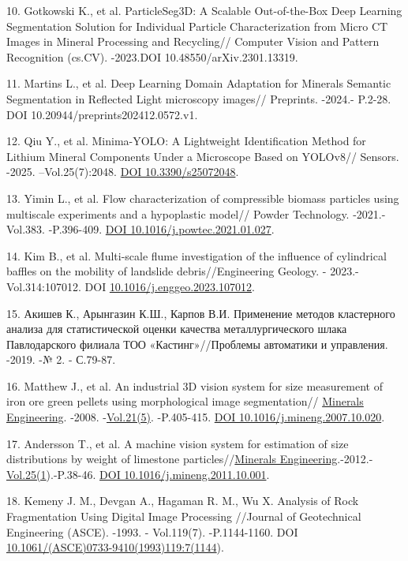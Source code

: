 \begin{refs}
10. Gotkowski K., et al. ParticleSeg3D: A Scalable Out-of-the-Box Deep
Learning Segmentation Solution for Individual Particle Characterization
from Micro CT Images in Mineral Processing and Recycling//
Computer Vision and Pattern Recognition (cs.CV). -2023.DOI
10.48550/arXiv.2301.13319.

11. Martins L., et al. Deep Learning Domain Adaptation for Minerals
Semantic Segmentation in Reflected Light microscopy images// Preprints.
-2024.- P.2-28. DOI 10.20944/preprints202412.0572.v1.

12. Qiu Y., et al. Minima-YOLO: A Lightweight Identification Method for
Lithium Mineral Components Under a Microscope Based on YOLOv8// Sensors.
-2025. --Vol.25(7):2048. \href{https://doi.org/10.3390/s25072048}{DOI
10.3390/s25072048}.

13. Yimin L., et al. Flow characterization of compressible biomass
particles using multiscale experiments and a hypoplastic model// Powder
Technology. -2021.-Vol.383. -P.396-409.
\href{https://doi.org/10.1016/j.powtec.2021.01.027}{DOI
10.1016/j.powtec.2021.01.027}.

14. Kim B., et al. Multi-scale flume investigation of the influence of
cylindrical baffles on the mobility of landslide debris//Engineering
Geology. - 2023.-Vol.314:107012. DOI
\href{https://doi.org/10.1016/j.enggeo.2023.107012}{10.1016/j.enggeo.2023.107012}.

15. Акишев К., Арынгазин К.Ш., Карпов В.И. Применение методов
кластерного анализа для статистической оценки качества металлургического
шлака Павлодарского филиала ТОО «Кастинг»//Проблемы автоматики и
управления. -2019. -№ 2. - С.79-87.

16. Matthew J., et al. An industrial 3D vision system for size
measurement of iron ore green pellets using morphological image
segmentation//
\href{https://www.sciencedirect.com/journal/minerals-engineering}{Minerals
Engineering}. -2008. -\href{Vol.\%2021(5)}{Vol.21(5)}. -P.405-415.
\href{https://doi.org/10.1016/j.mineng.2007.10.020}{DOI
10.1016/j.mineng.2007.10.020}.

17. Andersson T., et al. A machine vision system for estimation of size
distributions by weight of limestone
particles//\href{https://www.sciencedirect.com/journal/minerals-engineering}{Minerals
Engineering}.-2012.-\href{Vol.\%2025(1}{Vol.25(1}).-P.38-46.
\href{https://doi.org/10.1016/j.mineng.2011.10.001}{DOI
10.1016/j.mineng.2011.10.001}.

18. Kemeny J. M., Devgan A., Hagaman R. M., Wu X. Analysis of Rock
Fragmentation Using Digital Image Processing //Journal of Geotechnical
Engineering (ASCE). -1993. - Vol.119(7). -P.1144-1160. DOI
\href{https://doi.org/10.1061/(ASCE)0733-9410(1993)119:7(1144)}{10.1061/(ASCE)0733-9410(1993)119:7(1144}).


\end{refs}
